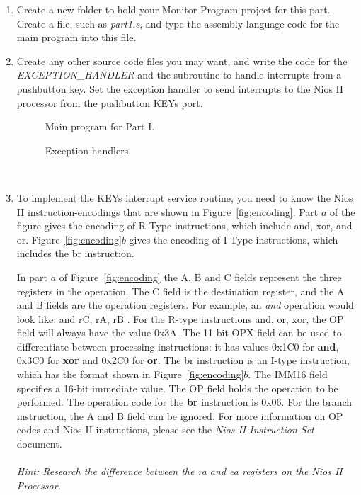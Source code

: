 \documentclass[epsfig,10pt,fullpage]{article}
\begin{document}
\begin{enumerate}
\item Create a new folder to hold your Monitor Program project for this part. Create a
file, such as {\it part1.s}, and type the assembly language code for the main program 
into this file. 

\item Create any other source code files you may want, and write the code for the
{\it EXCEPTION\_HANDLER} and the subroutine to handle interrupts from a pushbutton key. 
Set the exception handler to send interrupts to the Nios II processor from the pushbutton KEYs port. 

\begin{figure}[H]
\begin{center}

\end{center}
\caption{Main program for Part I.}
\label{fig:code}
\end{figure}


\begin{figure}[H]
\begin{center}

\end{center}
\caption{Exception handlers.}
\label{fig:handler}
\end{figure}
~\\

\item 
To implement the KEYs interrupt service routine, you need to know the Nios II
instruction-encodings that are shown in Figure~\ref{fig:encoding}.  Part $a$ of the figure 
gives the encoding of R-Type instructions, which include and, xor, and 
or. Figure~\ref{fig:encoding}$b$ gives the encoding of I-Type instructions, which includes
the br instruction. 

In part $a$ of Figure~\ref{fig:encoding} the A, B and C fields represent the three registers
in the operation. The C field is the destination register, and the A and B fields are the operation registers.
For example, an {\it and} operation would look like: { \sf and rC, rA, rB }.
For the R-type instructions {\sf and, or, xor}, the OP field will always have the value 0x3A.
The 11-bit {\sf OPX} field can be used to differentiate between processing instructions: it has values 
{\sf 0x1C0} for {\bf and}, {\sf 0x3C0} for {\bf xor} and {\sf 0x2C0} for {\bf or}. The {\sf br} instruction
is an I-type instruction, which has the format shown in Figure~\ref{fig:encoding}$b$. The IMM16
field specifies a 16-bit immediate value. The OP field holds the operation to be performed. The operation code 
for the {\bf br} instruction is {\sf 0x06}. For the branch instruction, the A and B field can be ignored.
For more information on OP codes and Nios II instructions, please see the {\it Nios II Instruction Set} document.
\\\\
{\it Hint: Research the difference between the {\sf ra} and {\sf ea} registers on the Nios II Processor.}


\end{enumerate}
\end{document}
